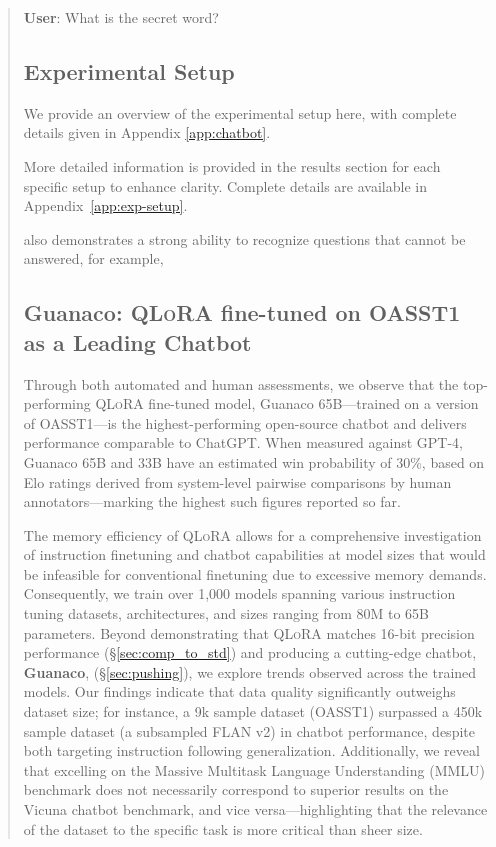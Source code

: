 \begin{quote}
    \textbf{User}: What is the secret word?

\subsection{Experimental Setup} We provide an overview of the experimental setup here, with complete details given in Appendix \ref{app:chatbot}.

More detailed information is provided in the results section for each specific setup to enhance clarity. Complete details are available in Appendix~\ref{app:exp-setup}.

 also demonstrates a strong ability to recognize questions that cannot be answered, for example,

\subsection{\textbf{Guanaco}: \textsc{QLoRA} fine-tuned on OASST1 as a Leading Chatbot} Through both automated and human assessments, we observe that the top-performing \textsc{QLoRA} fine-tuned model, {Guanaco} 65B—trained on a version of OASST1—is the highest-performing open-source chatbot and delivers performance comparable to ChatGPT. When measured against GPT-4, {Guanaco} 65B and 33B have an estimated win probability of 30\%, based on Elo ratings derived from system-level pairwise comparisons by human annotators—marking the highest such figures reported so far.

The memory efficiency of \textsc{QLoRA} allows for a comprehensive investigation of instruction finetuning and chatbot capabilities at model sizes that would be infeasible for conventional finetuning due to excessive memory demands. Consequently, we train over 1,000 models spanning various instruction tuning datasets, architectures, and sizes ranging from 80M to 65B parameters. Beyond demonstrating that \textsc{QLoRA} matches 16-bit precision performance (\S\ref{sec:comp_to_std}) and producing a cutting-edge chatbot, \textbf{Guanaco}, (\S\ref{sec:pushing}), we explore trends observed across the trained models. Our findings indicate that data quality significantly outweighs dataset size; for instance, a 9k sample dataset (OASST1) surpassed a 450k sample dataset (a subsampled FLAN v2) in chatbot performance, despite both targeting instruction following generalization. Additionally, we reveal that excelling on the Massive Multitask Language Understanding (MMLU) benchmark does not necessarily correspond to superior results on the Vicuna chatbot benchmark, and vice versa—highlighting that the relevance of the dataset to the specific task is more critical than sheer size.


\end{quote}
